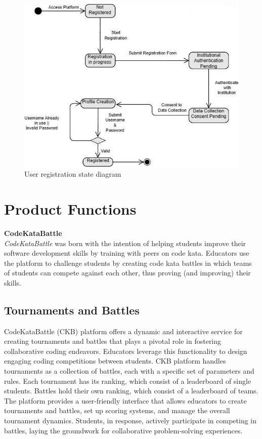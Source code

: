 \begin{figure}[H]
    \begin{center}
        \includegraphics[width=0.9\linewidth]{Images/User-registration.jpg}
        \caption{User registration state diagram}
        \label{fig:state_diagram_1}%
    \end{center}
\end{figure}

\section{Product Functions}
\label{sec:product_functions}%
\textbf{CodeKataBattle}\\
\noindent\textit{CodeKataBattle} was born with the intention of helping students improve their software development skills by training with peers on code kata.
Educators use the platform to challenge students by creating code kata battles in which teams of students can compete against each other, thus proving (and improving) their skills.\\
\subsection*{Tournaments and Battles}
CodeKataBattle (CKB) platform offers a dynamic and interactive service for creating tournaments and battles that plays a pivotal role in fostering collaborative coding endeavors. 
Educators leverage this functionality to design engaging coding competitions between students.
CKB platform handles tournaments as a collection of battles, each with a specific set of parameters and rules. Each tournament has its ranking, which consist of a leaderboard of single students.
Battles hold their own ranking, which consist of a leaderboard of teams. 
The platform provides a user-friendly interface that allows educators to create tournaments and battles, set up scoring systems, and manage the overall tournament dynamics.
Students, in response, actively participate in competing in battles, laying the groundwork for collaborative problem-solving experiences.

